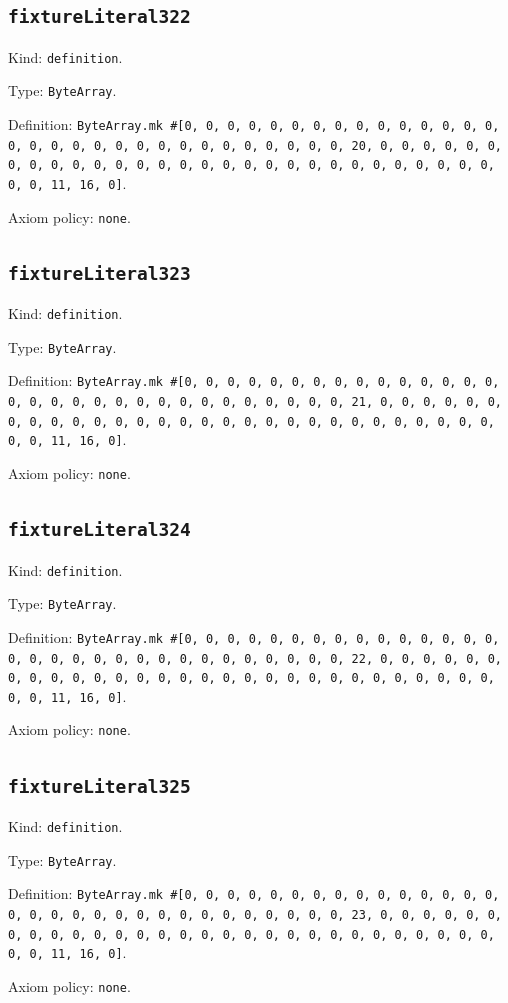 \documentclass[11pt]{article}
\begin{document}
\subsection*{\texttt{fixtureLiteral322}}
\noindent Kind: \texttt{definition}.\par
\noindent Type: \texttt{ByteArray}.\par
\noindent Definition: \texttt{ByteArray.mk \#[0, 0, 0, 0, 0, 0, 0, 0, 0, 0, 0, 0, 0, 0, 0, 0, 0, 0, 0, 0, 0, 0, 0, 0, 0, 0, 0, 0, 0, 0, 0, 20, 0, 0, 0, 0, 0, 0, 0, 0, 0, 0, 0, 0, 0, 0, 0, 0, 0, 0, 0, 0, 0, 0, 0, 0, 0, 0, 0, 0, 0, 0, 0, 11, 16, 0]}.\par
\noindent Axiom policy: \texttt{none}.\par
\subsection*{\texttt{fixtureLiteral323}}
\noindent Kind: \texttt{definition}.\par
\noindent Type: \texttt{ByteArray}.\par
\noindent Definition: \texttt{ByteArray.mk \#[0, 0, 0, 0, 0, 0, 0, 0, 0, 0, 0, 0, 0, 0, 0, 0, 0, 0, 0, 0, 0, 0, 0, 0, 0, 0, 0, 0, 0, 0, 0, 21, 0, 0, 0, 0, 0, 0, 0, 0, 0, 0, 0, 0, 0, 0, 0, 0, 0, 0, 0, 0, 0, 0, 0, 0, 0, 0, 0, 0, 0, 0, 0, 11, 16, 0]}.\par
\noindent Axiom policy: \texttt{none}.\par
\subsection*{\texttt{fixtureLiteral324}}
\noindent Kind: \texttt{definition}.\par
\noindent Type: \texttt{ByteArray}.\par
\noindent Definition: \texttt{ByteArray.mk \#[0, 0, 0, 0, 0, 0, 0, 0, 0, 0, 0, 0, 0, 0, 0, 0, 0, 0, 0, 0, 0, 0, 0, 0, 0, 0, 0, 0, 0, 0, 0, 22, 0, 0, 0, 0, 0, 0, 0, 0, 0, 0, 0, 0, 0, 0, 0, 0, 0, 0, 0, 0, 0, 0, 0, 0, 0, 0, 0, 0, 0, 0, 0, 11, 16, 0]}.\par
\noindent Axiom policy: \texttt{none}.\par
\subsection*{\texttt{fixtureLiteral325}}
\noindent Kind: \texttt{definition}.\par
\noindent Type: \texttt{ByteArray}.\par
\noindent Definition: \texttt{ByteArray.mk \#[0, 0, 0, 0, 0, 0, 0, 0, 0, 0, 0, 0, 0, 0, 0, 0, 0, 0, 0, 0, 0, 0, 0, 0, 0, 0, 0, 0, 0, 0, 0, 23, 0, 0, 0, 0, 0, 0, 0, 0, 0, 0, 0, 0, 0, 0, 0, 0, 0, 0, 0, 0, 0, 0, 0, 0, 0, 0, 0, 0, 0, 0, 0, 11, 16, 0]}.\par
\noindent Axiom policy: \texttt{none}.\par
\end{document}
